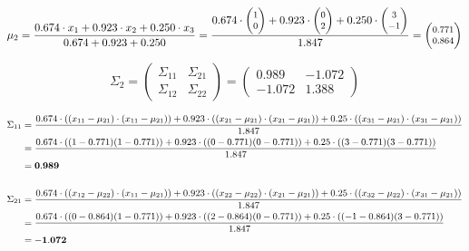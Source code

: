 \documentclass[12pt]{article}
\begin{document}
\begin{enumerate}
    \begin{equation*}
        \fontsize{8pt}{10pt}\selectfont
        \mu_2 = \frac{0.674 \cdot x_1 + 0.923 \cdot x_2 + 0.250 \cdot x_3}{0.674+0.923+0.250} = \frac{0.674 \cdot \begin{pmatrix}
        1\\
        0
        \end{pmatrix}+ 0.923 \cdot \begin{pmatrix}
        0\\
        2
        \end{pmatrix} + 0.250 \cdot \begin{pmatrix}
        3\\
        -1
        \end{pmatrix}}{1.847} = \begin{pmatrix}
        0.771\\
        0.864
        \end{pmatrix}
    \end{equation*}

    \begin{equation*}
        \Sigma_2 = \begin{pmatrix}
            \Sigma_{11} & \Sigma_{21} \\
            \Sigma_{12} & \Sigma_{22}
        \end{pmatrix} = \begin{pmatrix}
            0.989 & -1.072 \\
            -1.072 & 1.388
        \end{pmatrix}
    \end{equation*}

    \begin{equation*}
        \fontsize{9pt}{10pt}\selectfont
        \begin{aligned}
            \Sigma_{11} &= \frac{0.674 \cdot ((x_{11}-\mu_{21}) \cdot (x_{11} - \mu_{21}))+ 0.923 \cdot ((x_{21}-\mu_{21}) \cdot (x_{21} - \mu_{21}))+ 0.25 \cdot ((x_{31}-\mu_{21}) \cdot (x_{31} - \mu_{21}))}{1.847}\\
            &=\frac{0.674 \cdot ((1-0.771)(1-0.771)) + 0.923 \cdot ((0-0.771)(0-0.771))+ 0.25 \cdot ((3-0.771)(3-0.771))}{1.847} \\
            &= \mathbf{0.989}\\
            \\
            \Sigma_{21} &= \frac{0.674 \cdot ((x_{12}-\mu_{22}) \cdot (x_{11} - \mu_{21}))+ 0.923 \cdot ((x_{22}-\mu_{22}) \cdot (x_{21} - \mu_{21}))+ 0.25 \cdot ((x_{32}-\mu_{22}) \cdot (x_{31} - \mu_{21}))}{1.847}\\
            &=\frac{0.674 \cdot ((0-0.864)(1-0.771)) + 0.923 \cdot ((2-0.864)(0-0.771)) + 0.25 \cdot ((-1-0.864)(3-0.771))}{1.847} \\
            &= \mathbf{-1.072}\\
            \\
        \end{aligned}
    \end{equation*}


\end{enumerate}
\end{document}
